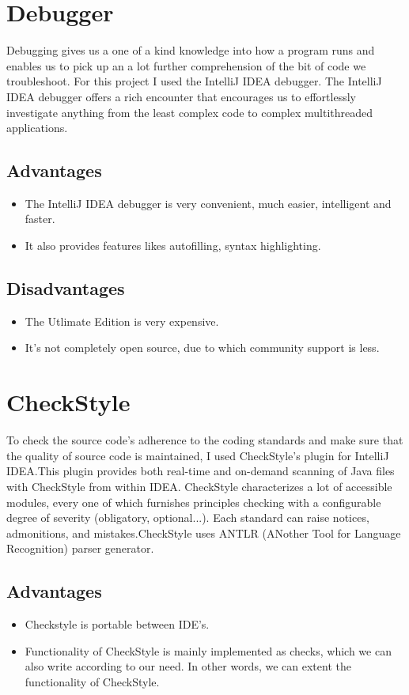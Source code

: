 \documentclass{article}
\begin{document}
\section{Debugger}
Debugging gives us a one of a kind knowledge into how a program runs and enables us to pick up an a lot further comprehension of the bit of code we troubleshoot. For this project I used the IntelliJ IDEA debugger. The IntelliJ IDEA debugger offers a rich encounter that encourages us to effortlessly investigate anything from the least complex code to complex multithreaded applications.
\subsection{Advantages}
\begin{itemize}
   \item The IntelliJ IDEA debugger is very convenient, much easier, intelligent and faster.
   \item It also provides features likes autofilling, syntax highlighting.
\end{itemize}
\subsection{Disadvantages}
\begin{itemize}
   \item The Utlimate Edition is very expensive.
   \item It's not completely open source, due to which community support is less.
\end{itemize}
\pagebreak

\section{CheckStyle}
To check the source code's adherence to the coding standards and make sure that the quality of source code is maintained, I used CheckStyle's plugin for IntelliJ IDEA.This plugin provides both real-time and on-demand scanning of Java files with CheckStyle from within IDEA. CheckStyle characterizes a lot of accessible modules, every one of which furnishes principles checking with a configurable degree of severity (obligatory, optional...). Each standard can raise notices, admonitions, and mistakes.CheckStyle uses ANTLR (ANother Tool for Language Recognition) parser generator.
\subsection{Advantages}
\begin{itemize}
   \item Checkstyle is portable between IDE's.
   \item Functionality of CheckStyle is mainly implemented as checks, which we can also write according to our need. In other words, we can extent the functionality of CheckStyle.
\end{itemize}
\end{document}
